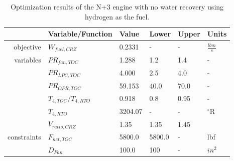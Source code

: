 \documentclass[conf]{new-aiaa}
\begin{document}
\begin{table}[hbt!]
    \centering
    \caption{Optimization results of the N+3 engine with no water recovery using hydrogen as the fuel.
    }
    \small
    \renewcommand{\arraystretch}{1.2}
    \begin{tabular}{r l l l l l}
                    & Variable/Function     & Value   & Lower  & Upper & Units           \\
        \toprule
        objective   & $W_{fuel,CRZ}$        & 0.2331  & -      & -     & $\frac{lbm}{s}$ \\
        \hline
        variables   & $PR_{fan,TOC}$        & 1.288   & 1.2    & 1.4   & -               \\
                    & $PR_{LPC,TOC}$        & 4.000   & 2.5    & 4.0   & -               \\
                    & $PR_{OPR,TOC}$        & 59.153  & 40.0   & 70.0  & -               \\
                    & $T_{4,TOC}/T_{4,RTO}$ & 0.918   & 0.8    & 0.95  & -               \\
                    & $T_{4,RTO}$           & 3204.07 & -      & -     & $^\circ$R       \\
                    & $V_{ratio,CRZ}$       & 1.35    & 1.35   & 1.45  &                 \\
        \hline
        constraints & $F_{net,TOC}$         & 5800.0  & 5800.0 & -     & lbf             \\
                    & $D_{Fan}$             & 100.0   & 100    & -     & $in^2$          \\
        \bottomrule
    \end{tabular}
    \label{tab:res_thermo_opt_H2}
\end{table}
\end{document}
